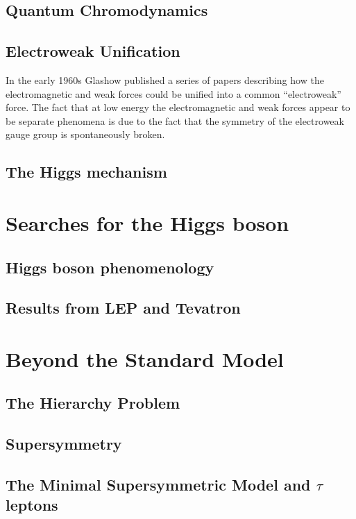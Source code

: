 \subsection{Quantum Chromodynamics}

\subsection{Electroweak Unification}
In the early 1960s Glashow published a series of papers describing how the
electromagnetic and weak forces could be unified into a common ``electroweak''
force.  The fact that at low energy the electromagnetic and weak forces appear
to be separate phenomena is due to the fact that the symmetry of the electroweak
gauge group is spontaneously broken.

\subsection{The Higgs mechanism}


\section{Searches for the Higgs boson}
\subsection{Higgs boson phenomenology}
\label{sec:SMHiggsPhenom}
\subsection{Results from LEP and Tevatron}

\section{Beyond the Standard Model}
\label{sec:BSM}
\subsection{The Hierarchy Problem}
\subsection{Supersymmetry}
\subsection{The Minimal Supersymmetric Model and $\tau$ leptons}
\label{sec:MSSMAndTaus}


